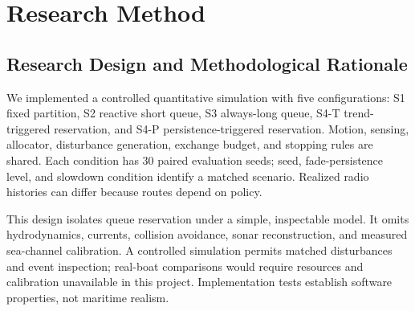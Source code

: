\section{Research Method}
\subsection{Research Design and Methodological Rationale}
We implemented a controlled quantitative simulation with five configurations: S1 fixed partition, S2 reactive short queue, S3 always-long queue, S4-T trend-triggered reservation, and S4-P persistence-triggered reservation. Motion, sensing, allocator, disturbance generation, exchange budget, and stopping rules are shared. Each condition has 30 paired evaluation seeds; seed, fade-persistence level, and slowdown condition identify a matched scenario. Realized radio histories can differ because routes depend on policy.

This design isolates queue reservation under a simple, inspectable model. It omits hydrodynamics, currents, collision avoidance, sonar reconstruction, and measured sea-channel calibration. A controlled simulation permits matched disturbances and event inspection; real-boat comparisons would require resources and calibration unavailable in this project. Implementation tests establish software properties, not maritime realism.

